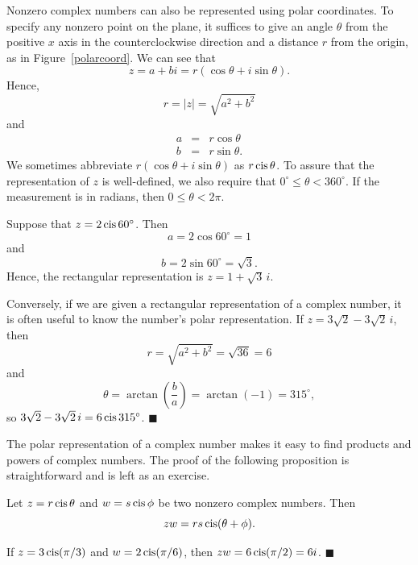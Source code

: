  
Nonzero complex numbers can also be represented using {\bfi polar
coordinates}.  To specify  any nonzero point on the plane, it suffices
to give an angle $\theta$ from the positive $x$ axis in the
counterclockwise direction and a distance $r$ from the origin, as in 
Figure~\ref{polarcoord}. We can see that 
$$
z = a + bi = r( \cos \theta + i \sin \theta).
$$
Hence,
$$
r = |z| = \sqrt{a^2+b^2}
$$
and
\begin{eqnarray*}
a & = & r \cos \theta \\
b & = & r \sin \theta.
\end{eqnarray*}
We sometimes abbreviate $r( \cos \theta + i \sin \theta)$ as $r \operatorname{cis}
\theta$\label{cosisin}.  To assure that the representation of $z$ is 
well-defined, we also require that $0^{\circ} \leq \theta <
360^{\circ}$.  If the measurement is in radians, then $0 \leq \theta <
2 \pi$. 
 
 
\vspace{ 2ex }
 
 
Suppose that $z = 2 \operatorname{cis}  60^{\circ}$. Then
$$
a  =  2 \cos 60^{\circ}  =   1
$$
and
$$
b  =  2 \sin 60^{\circ}  =  \sqrt{3}.
$$
Hence, the rectangular representation is $z = 1+\sqrt{3}\, i$.
 
 
Conversely, if we are given a rectangular representation of a complex
number, it is often useful to know the number's polar representation.
If $z = 3 \sqrt{2} - 3 \sqrt{2}\, i$, then 
$$
r = \sqrt{a^2 + b^2} = \sqrt{36 } = 6
$$
and
$$
\theta = \arctan \left( \frac{b}{a} \right) = \arctan( - 1) =
315^{\circ},
$$
so $3 \sqrt{2} - 3 \sqrt{2}\, i=6 \operatorname{cis}  315^{\circ}$.
\hspace{\fill} $\blacksquare$
 
 
\vspace{ 2ex }
 
 
The polar representation of a complex number makes it easy to find
products and powers of complex numbers.  The proof of the following
proposition is straightforward and is left as an exercise.
 
 
\begin{proposition}
Let $z = r \operatorname{cis} \theta$ and $w = s \operatorname{cis} \phi$
be two nonzero complex numbers. Then 
$$
zw = r s \operatorname{cis}( \theta + \phi).
$$
\end{proposition}
 
 
If $z =  3 \operatorname{cis}( \pi / 3 )$ and $w = 2 \operatorname{cis}(\pi / 6 )$, then $zw = 6
\operatorname{cis}( \pi / 2 ) = 6i$.  
\hspace{\fill} $\blacksquare$
 
